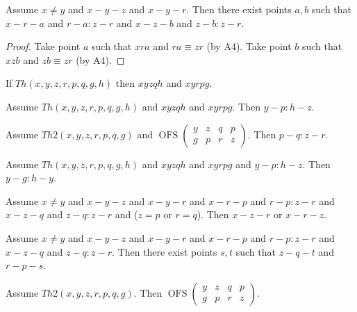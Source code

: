 \documentclass[10pt,a4paper,parskip=half,numbers=endperiod,headings=standardclasses,parskip]{scrbook}
\newcommand{\Cong}[4]{#1 #2 \equiv #3 #4}
\newcommand{\Betw}[3]{#1 #2 #3}
\newcommand{\BetwFive}[5]{#1 #2 #3 #4 #5}
\newcommand{\OFS}[8]{\operatorname{OFS}
\left(\begin{smallmatrix}%
#1 & #2 & #3 & #4 \\
#5 & #6 & #7 & #8
\end{smallmatrix}\right)%
}
\begin{document}
  \begin{forthel}
    \begin{lemma} %
      Assume $x \neq y$ and $x-y-z$ and $x-y-r$. Then there exist points $a,b$ such that $x-r-a$ and $r-a : z-r$ and $x-z-b$ and $z-b : z-r$.
    \end{lemma}
    \begin{proof}
      Take point $a$ such that $\Betw{x}{r}{a}$ and $\Cong{r}{a}{z}{r}$ (by A4).
      Take point $b$ such that $\Betw{x}{z}{b}$ and $\Cong{z}{b}{z}{r}$ (by A4).
    \end{proof}

    \begin{axiom} %
      If $Th(x,y,z,r,p,q,g,h)$ then
      $\BetwFive{x}{y}{z}{q}{h}$ and
      $\BetwFive{x}{y}{r}{p}{g}$.
    \end{axiom}

    \begin{axiom} %
      Assume $Th(x,y,z,r,p,q,g,h)$ and
      $\BetwFive{x}{y}{z}{q}{h}$ and
      $\BetwFive{x}{y}{r}{p}{g}$. Then $y-p : h-z$.
    \end{axiom}

    \begin{axiom} %
      Assume $Th2(x,y,z,r,p,q,g)$ and $\OFS{y}{z}{q}{p}{g}{p}{r}{z}$. Then $p-q : z-r$.
    \end{axiom}

    \begin{axiom} %
      Assume $Th(x,y,z,r,p,q,g,h)$ and
      $\BetwFive{x}{y}{z}{q}{h}$ and
      $\BetwFive{x}{y}{r}{p}{g}$ and $y-p : h-z$. Then $y-g : h-y$.
    \end{axiom}



    \begin{lemma} %
      Assume $x \neq y$ and $x-y-z$ and $x-y-r$ and $x-r-p$ and $r-p : z-r$ and $x-z-q$ and $z-q : z-r$ and ($z = p$ or $r = q$). Then $x-z-r$ or $x-r-z$.
    \end{lemma}

    \begin{lemma} %
      Assume $x \neq y$ and $x-y-z$ and $x-y-r$ and $x-r-p$ and $r-p : z-r$ and $x-z-q$ and $z-q : z-r$. Then there exist points $s,t$ such that $z-q-t$ and $r-p-s$.
    \end{lemma}

    \begin{lemma} %
      Assume $Th2(x,y,z,r,p,q,g)$. Then $\OFS{y}{z}{q}{p}{g}{p}{r}{z}$.
    \end{lemma}


\end{forthel}
\end{document}
